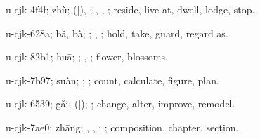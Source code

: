 \begin{multicols}{2}
{\cjkgGlue{}u-cjk-4f4f; zhù; \cjkgGlue{}\cjkgGlue{}(\cjkgGlue{}|\cjkgGlue{}), \cjkgGlue{}\cjkgGlue{}\cjkgGlue{}; \cjkgGlue{}, \cjkgGlue{}, \cjkgGlue{}; reside, live at, dwell, lodge, stop.

\cjkgGlue{}u-cjk-628a; bǎ, bà; \cjkgGlue{}; \cjkgGlue{}, \cjkgGlue{}; hold, take, guard, regard as.

\cjkgGlue{}u-cjk-82b1; huā; \cjkgGlue{}; \cjkgGlue{}, \cjkgGlue{}; flower, blossoms.

\cjkgGlue{}u-cjk-7b97; suàn; \cjkgGlue{}; \cjkgGlue{}; count, calculate, figure, plan.

\cjkgGlue{}u-cjk-6539; gǎi; \cjkgGlue{}\cjkgGlue{}(\cjkgGlue{}|\cjkgGlue{}); \cjkgGlue{}; change, alter, improve, remodel.

\cjkgGlue{}u-cjk-7ae0; zhāng; \cjkgGlue{}, \cjkgGlue{}, \cjkgGlue{}; \cjkgGlue{}; composition, chapter, section.

}
\end{multicols}
